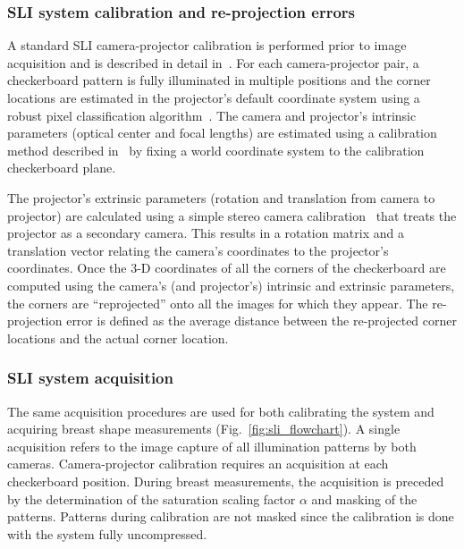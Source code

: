 \subsubsection{SLI system calibration and re-projection errors}
A standard SLI camera-projector calibration is performed prior to image acquisition and is described in detail in~\cite{Moreno2012}. For each camera-projector pair, a checkerboard pattern is fully illuminated in multiple positions and the corner locations are estimated in the projector's default coordinate system using a robust pixel classification algorithm~\cite{Xu2007}. The camera and projector's intrinsic parameters (optical center and focal lengths) are estimated using a calibration method described in~\cite{Zhang2000} by fixing a world coordinate system to the calibration checkerboard plane. 

The projector's extrinsic parameters (rotation and translation from camera to projector) are calculated using a simple stereo camera calibration~\cite{Bouguet2004} that treats the projector as a secondary camera. This results in a rotation matrix and a translation vector relating the camera's coordinates to the projector's coordinates. Once the 3-D coordinates of all the corners of the checkerboard are computed using the camera's (and projector's) intrinsic and extrinsic parameters, the corners are ``reprojected'' onto all the images for which they appear. The re-projection error is defined as the average distance between the re-projected corner locations and the actual corner location. 

\subsubsection{SLI system acquisition}
The same acquisition procedures are used for both calibrating the system and acquiring breast shape measurements (Fig.~\ref{fig:sli_flowchart}). A single acquisition refers to the image capture of all illumination patterns by both cameras. Camera-projector calibration requires an acquisition at each checkerboard position. During breast measurements, the acquisition is preceded by the determination of the saturation scaling factor $\alpha$ and masking of the patterns. Patterns during calibration are not masked since the calibration is done with the system fully uncompressed. 

